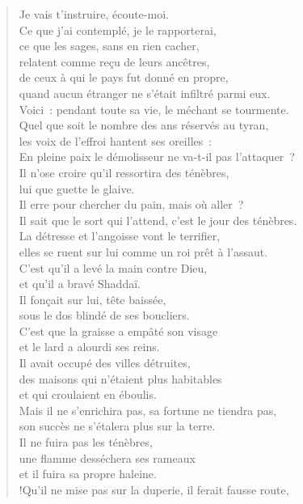 \documentclass[french,twoside]{book} %
\def\mednobreak{\ifdim\lastskip<\medskipamount
  \removelastskip\nopagebreak\medskip\fi}
\newcommand{\labelblock}[1]{\medbreak{\noindent\color{rubric}\bfseries #1}\par\mednobreak}
\begin{document}
\labelblock{Destinée de l’impie}


\begin{verse}
Je vais t’instruire, écoute-moi. \\
Ce que j’ai contemplé, je le rapporterai,\\
ce que les sages, sans en rien cacher, \\
relatent comme reçu de leurs ancêtres,\\
de ceux à qui le pays fut donné en propre, \\
quand aucun étranger ne s’était infiltré parmi eux.\\
Voici : pendant toute sa vie, le méchant se tourmente. \\
Quel que soit le nombre des ans réservés au tyran,\\
les voix de l’effroi hantent ses oreilles : \\
En pleine paix le démolisseur ne va-t-il pas l’attaquer ?\\
Il n’ose croire qu’il ressortira des ténèbres, \\
lui que guette le glaive.\\
Il erre pour chercher du pain, mais où aller ? \\
Il sait que le sort qui l’attend, c’est le jour des ténèbres.\\
La détresse et l’angoisse vont le terrifier, \\
elles se ruent sur lui comme un roi prêt à l’assaut.\\
C’est qu’il a levé la main contre Dieu, \\
et qu’il a bravé Shaddaï.\\
Il fonçait sur lui, tête baissée, \\
sous le dos blindé de ses boucliers.\\
C’est que la graisse a empâté son visage \\
et le lard a alourdi ses reins.\\
Il avait occupé des villes détruites, \\
des maisons qui n’étaient plus habitables \\
et qui croulaient en éboulis.\\
Mais il ne s’enrichira pas, sa fortune ne tiendra pas, \\
son succès ne s’étalera plus sur la terre.\\
Il ne fuira pas les ténèbres, \\
une flamme desséchera ses rameaux \\
et il fuira sa propre haleine.\\!Qu’il ne mise pas sur la duperie, il ferait fausse route, \\

\end{verse}
\end{document}
